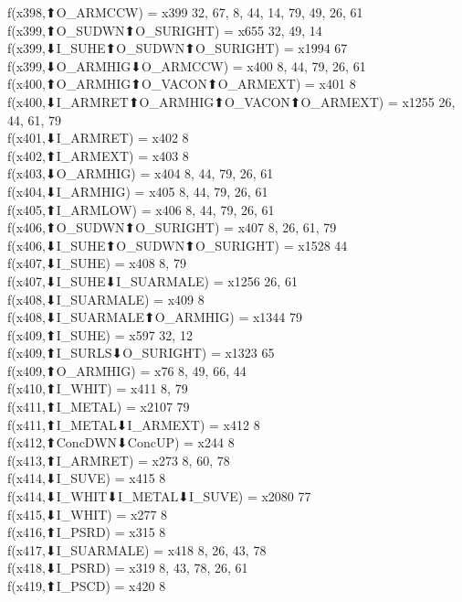 f(x398,⬆O_ARMCCW) = x399 {32, 67, 8, 44, 14, 79, 49, 26, 61} \\
f(x399,⬆O_SUDWN⬆O_SURIGHT) = x655 {32, 49, 14} \\
f(x399,⬇I_SUHE⬆O_SUDWN⬆O_SURIGHT) = x1994 {67} \\
f(x399,⬇O_ARMHIG⬇O_ARMCCW) = x400 {8, 44, 79, 26, 61} \\
f(x400,⬆O_ARMHIG⬆O_VACON⬆O_ARMEXT) = x401 {8} \\
f(x400,⬇I_ARMRET⬆O_ARMHIG⬆O_VACON⬆O_ARMEXT) = x1255 {26, 44, 61, 79} \\
f(x401,⬇I_ARMRET) = x402 {8} \\
f(x402,⬆I_ARMEXT) = x403 {8} \\
f(x403,⬇O_ARMHIG) = x404 {8, 44, 79, 26, 61} \\
f(x404,⬇I_ARMHIG) = x405 {8, 44, 79, 26, 61} \\
f(x405,⬆I_ARMLOW) = x406 {8, 44, 79, 26, 61} \\
f(x406,⬆O_SUDWN⬆O_SURIGHT) = x407 {8, 26, 61, 79} \\
f(x406,⬇I_SUHE⬆O_SUDWN⬆O_SURIGHT) = x1528 {44} \\
f(x407,⬇I_SUHE) = x408 {8, 79} \\
f(x407,⬇I_SUHE⬇I_SUARMALE) = x1256 {26, 61} \\
f(x408,⬇I_SUARMALE) = x409 {8} \\
f(x408,⬇I_SUARMALE⬆O_ARMHIG) = x1344 {79} \\
f(x409,⬆I_SUHE) = x597 {32, 12} \\
f(x409,⬆I_SURLS⬇O_SURIGHT) = x1323 {65} \\
f(x409,⬆O_ARMHIG) = x76 {8, 49, 66, 44} \\
f(x410,⬆I_WHIT) = x411 {8, 79} \\
f(x411,⬆I_METAL) = x2107 {79} \\
f(x411,⬆I_METAL⬇I_ARMEXT) = x412 {8} \\
f(x412,⬆ConcDWN⬇ConcUP) = x244 {8} \\
f(x413,⬆I_ARMRET) = x273 {8, 60, 78} \\
f(x414,⬇I_SUVE) = x415 {8} \\
f(x414,⬇I_WHIT⬇I_METAL⬇I_SUVE) = x2080 {77} \\
f(x415,⬇I_WHIT) = x277 {8} \\
f(x416,⬆I_PSRD) = x315 {8} \\
f(x417,⬇I_SUARMALE) = x418 {8, 26, 43, 78} \\
f(x418,⬇I_PSRD) = x319 {8, 43, 78, 26, 61} \\
f(x419,⬆I_PSCD) = x420 {8} \\
